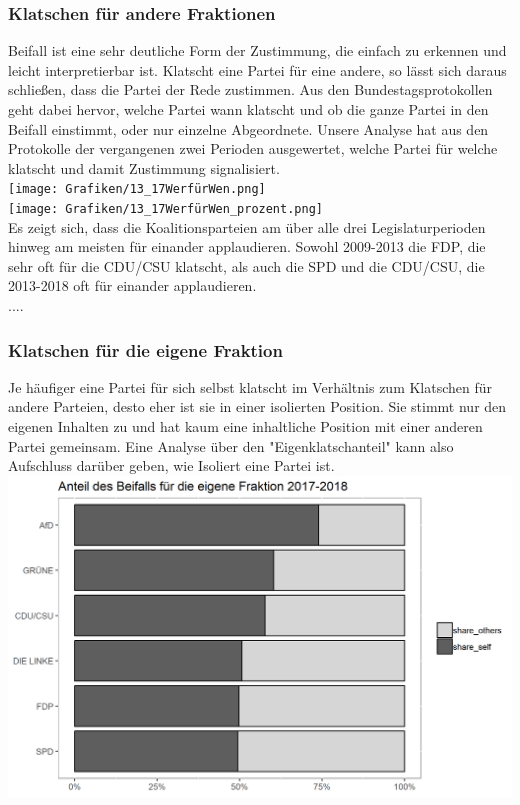 \subsubsection{Klatschen für andere Fraktionen}

 Beifall ist eine sehr deutliche Form der Zustimmung, die einfach zu erkennen und leicht interpretierbar ist. Klatscht eine Partei für eine andere, so lässt sich daraus schließen, dass die Partei der Rede zustimmen. Aus den Bundestagsprotokollen geht dabei hervor, welche Partei wann klatscht und ob die ganze Partei in den Beifall einstimmt, oder nur einzelne Abgeordnete. Unsere Analyse hat aus den Protokolle der vergangenen zwei Perioden ausgewertet, welche Partei für welche klatscht und damit Zustimmung signalisiert.   \\

\texttt{[image: Grafiken/13\_17WerfürWen.png]}\\
\texttt{[image: Grafiken/13\_17WerfürWen\_prozent.png]}\\
Es zeigt sich, dass die Koalitionsparteien am über alle drei Legislaturperioden hinweg am meisten für einander applaudieren. Sowohl 2009-2013 die FDP, die sehr oft für die CDU/CSU klatscht, als auch die SPD und die CDU/CSU, die 2013-2018 oft für einander applaudieren. \\
....
\subsubsection{Klatschen für die eigene Fraktion}
 \noindent Je häufiger eine Partei für sich selbst klatscht im Verhältnis zum Klatschen für andere Parteien, desto eher ist sie in einer isolierten Position. Sie stimmt nur den eigenen Inhalten zu und hat kaum eine inhaltliche Position mit einer anderen Partei gemeinsam. Eine Analyse über den "Eigenklatschanteil" kann also Aufschluss darüber geben, wie Isoliert eine Partei ist. \\

\includegraphics[width=\linewidth]{Grafiken/17_eigenklatschanteil.png}

